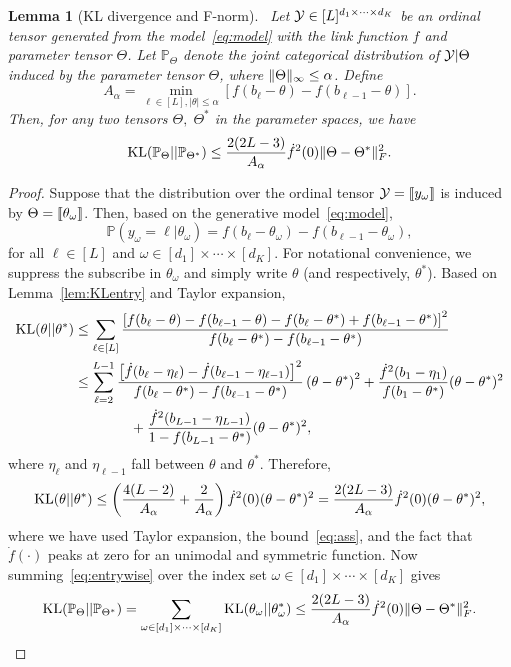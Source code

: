 \documentclass[11pt]{article}
\theoremstyle{plain}
\newtheorem{lem}{Lemma}
\theoremstyle{definition}
\begin{document}
\begin{lem}[KL divergence and F-norm]~\label{lem:KL}
Let $\mathcal{Y}\in[L]^{d_1\times \cdots \times d_K}$ be an ordinal tensor generated from the model~\eqref{eq:model} with the link function $f$ and parameter tensor $\Theta$. Let $\mathbb{P}_{\Theta}$ denote the joint categorical distribution of $\mathcal{Y}|\Theta$ induced by the parameter tensor $\Theta$, where $\lVert\Theta\rVert_\infty\leq \alpha$. Define
\begin{equation}\label{eq:ass}
A_\alpha=\min_{\ell\in[L], |\theta|\leq \alpha}\left[f(b_\ell-\theta)-f(b_{\ell-1}-\theta)\right].
\end{equation}
Then, for any two tensors $\Theta,\; \Theta^*$ in the parameter spaces, we have
\[
\mathrm{KL}(\mathbb{P}_{\Theta}|| \mathbb{P}_{\Theta^*})\leq {2(2L-3)\over A_\alpha} \dot{f}^2(0)\lVert\Theta-\Theta^*\rVert_F^2.
\]
\end{lem}
\begin{proof} Suppose that the distribution over the ordinal tensor $\mathcal{Y}=\llbracket y_\omega \rrbracket$ is induced by $\Theta=\llbracket \theta_\omega \rrbracket$. Then, based on the generative model~\eqref{eq:model},
\[
\mathbb{P}(y_\omega=\ell | \theta_\omega)=f(b_{\ell}-\theta_\omega)-f(b_{\ell-1}-\theta_\omega),
\]
for all $\ell\in[L]$ and $\omega\in[d_1]\times \cdots \times [d_K]$. For notational convenience, we suppress the subscribe in $\theta_\omega$ and simply write $\theta$ (and respectively, $\theta^*$). Based on Lemma~\ref{lem:KLentry} and Taylor expansion,
\begin{align}
\text{KL}(\theta|| \theta^*) & \leq \sum_{\ell\in[L]} {\left[f(b_{\ell}-\theta)-f(b_{\ell-1}-\theta)-f(b_{\ell}-\theta^*)+f(b_{\ell-1}-\theta^*)\right]^2\over f(b_{\ell}-\theta^*)-f(b_{\ell-1}-\theta^*)}\\
 &\leq \sum_{\ell=2}^{L-1} {\left[\dot{f}(b_\ell-\eta_\ell)-\dot{f}(b_{\ell-1}-\eta_{\ell-1})\right]^2 \over f(b_\ell-\theta^*)-f(b_{\ell-1}-\theta^*)} \left(\theta-\theta^*\right)^2+{\dot{f}^2(b_1-\eta_1) \over f(b_1-\theta^*)} (\theta-\theta^*)^2\\
 &\quad \quad\quad \quad  +{\dot{f}^2(b_{L-1}-\eta_{L-1})\over 1-f(b_{L-1}-\theta^*)}(\theta-\theta^*)^2,
\end{align}
where $\eta_\ell$ and $\eta_{\ell-1}$ fall between $\theta$ and $\theta^*$. Therefore,
\begin{equation}\label{eq:entrywise}
\text{KL}(\theta|| \theta^*) \leq \left({4(L-2)\over A_\alpha}+ {2\over A_\alpha}\right)\dot{f}^2(0)(\theta-\theta^*)^2={2(2L-3)\over A_\alpha} \dot{f}^2(0)(\theta-\theta^*)^2,
\end{equation}
where we have used Taylor expansion, the bound~\eqref{eq:ass}, and the fact that $\dot{f}(\cdot)$ peaks at zero for an unimodal and symmetric function. Now summing~\eqref{eq:entrywise} over the index set $\omega\in[d_1]\times \cdots \times [d_K]$ gives
\[
\text{KL}(\mathbb{P}_{\Theta}|| \mathbb{P}_{\Theta^*}) =\sum_{\omega\in[d_1]\times \cdots \times[d_K]} \text{KL}(\theta_\omega || \theta^*_\omega) \leq {2(2L-3)\over A_\alpha} \dot{f}^2(0)\lVert\Theta-\Theta^*\rVert_F^2.
\]
\end{proof}
\end{document}
